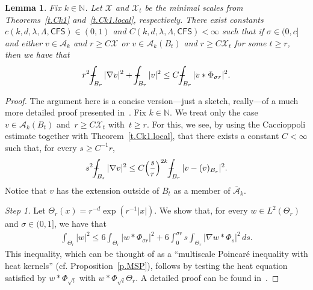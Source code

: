 \documentclass[11pt]{article} %
\numberwithin{equation}{section}
\newtheorem{lemma}[theorem]{Lemma}
\theoremstyle{definition}
\let\originalleft\left
\let\originalright\right
\renewcommand{\left}{\mathopen{}\mathclose\bgroup\originalleft}
\renewcommand{\right}{\aftergroup\egroup\originalright}
\newcommand*{\N}{\ensuremath{\mathbb{N}}}
\newcommand{\X}{\mathcal{X}}
\def\Xint#1{\mathchoice
{\XXint\displaystyle\textstyle{#1}}%
{\XXint\textstyle\scriptstyle{#1}}%
{\XXint\scriptstyle\scriptscriptstyle{#1}}%
{\XXint\scriptscriptstyle\scriptscriptstyle{#1}}%
\!\int}
\def\XXint#1#2#3{{\setbox0=\hbox{$#1{#2#3}{\int}$}
\vcenter{\hbox{$#2#3$}}\kern-.5\wd0}}
\def\fint{\Xint-}
\newcommand{\CFS}{\mathsf{CFS}}
\newcommand{\A}{\mathcal{A}}
\newcommand{\Ahom}{\bar{\A}}
\begin{document}
\begin{lemma}
\label{l.MSP.heat}
Fix $k \in \N$. Let $\X$ and $\X_t$ be the minimal scales from Theorems~\ref{t.Ck1} and~\ref{t.Ck1.local}, respectively. There exist constants $c(k,d,\lambda,\Lambda,\CFS)\in (0,1)$ and $C(k,d,\lambda,\Lambda,\CFS)<\infty$ such that if $\sigma \in (0,c]$ and either $v \in \A_k$ and $r \geq C \X$ or $v \in \A_k(B_t)$ and $r \geq C \X_t$ for some $t \geq r$, then we have that
\begin{align}  \label{e.MSP.heat}
r^2 \fint_{B_{r} } |\nabla v|^2
+
\fint_{B_{r} } |v|^2  \leq C \fint_{ B_r } | v \ast \Phi_{\sigma r}|^2 
.
\end{align}
\end{lemma}
\begin{proof}
The argument here is a concise version---just a sketch, really---of a much more detailed proof presented in~\cite{AKMBook}. %
Fix $k \in \N$. We treat only the case $v \in \A_k(B_t)$ and~$r \geq  C \X_t$ with~$t\geq r$. For this, we see, by using the Caccioppoli estimate together with Theorem~\ref{t.Ck1.local}, that there exists a constant $C<\infty$ such that, for every $s \geq C^{-1}r$, 
\begin{align}  \label{e.MSP.heat.step0}
s^2 \fint_{B_s} | \nabla v|^2  \leq C \left(\frac sr\right)^{2k} \fint_{B_{r}} |v - (v)_{B_r}|^2  .
\end{align}
Notice that $v$ has the extension outside of $B_t$ as a member of $\Ahom_k$. 




\smallskip
 
\emph{Step 1.}  Let $\Theta_r(x) = r^{-d} \exp( r^{-1} |x|)$. We show that, for every $w \in L^2(\Theta_r)$ and $\sigma \in (0,1]$, we have that 
\begin{align}  \label{e.MSP.heat.step1}
\int_{\Theta_r} |w|^2 
\leq 
6 \int_{\Theta_r} | w \ast \Phi_{\sigma r}|^2 
+ 
6  \int_{0}^{\sigma r}  s \int_{\Theta_r} | \nabla w \ast \Phi_{s}|^2 \, ds
.
\end{align}
 This inequality, which can be thought of as a ``multiscale Poincar\'e inequality with heat kernels'' (cf. Proposition~\ref{p.MSP}), follows by testing the heat equation satisfied by $w \ast \Phi_{\sqrt{t}}$ with $ w \ast \Phi_{\sqrt{t}} \Theta_r$. A detailed proof can be found in~\cite[Lemma 4.19]{AKMBook}. 
 
 \smallskip
 

\end{proof}
\end{document}
